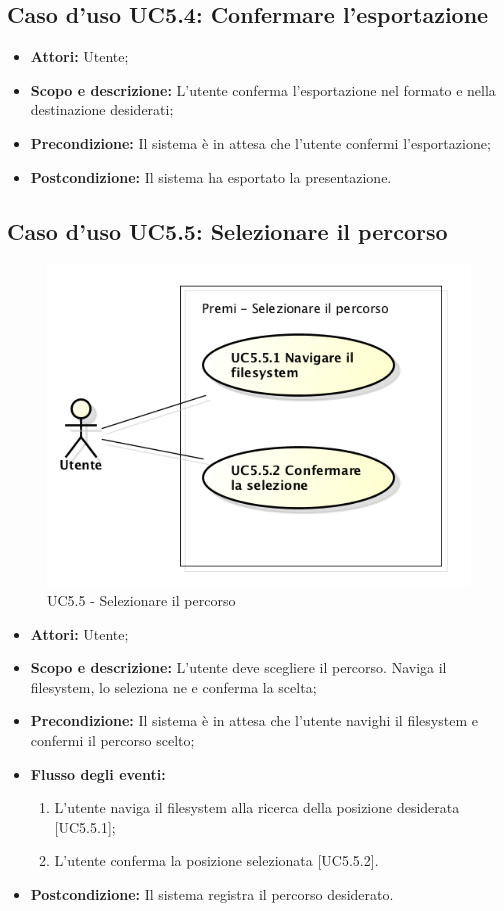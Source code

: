 \subsection{Caso d'uso UC5.4: Confermare l'esportazione}
	\begin{itemize}
		\item \textbf{Attori:} Utente;
		\item \textbf{Scopo e descrizione:} L'utente conferma l'esportazione nel formato e nella destinazione desiderati;
		\item \textbf{Precondizione:} Il sistema è in attesa che l'utente confermi l'esportazione;
		\item \textbf{Postcondizione:} Il sistema ha esportato la presentazione.
	\end{itemize}


\subsection{Caso d'uso UC5.5: Selezionare il percorso}
	\begin{figure}[h]
		\centering
		\includegraphics[scale=0.45] {img/UC5.5.png}
		\caption{UC5.5 - Selezionare il percorso}
	\end{figure}
	\begin{itemize}
		\item \textbf{Attori:} Utente;
		\item \textbf{Scopo e descrizione:} L'utente deve scegliere il percorso. Naviga il \gls{filesystem}, lo seleziona ne e conferma la scelta;
		\item \textbf{Precondizione:} Il sistema è in attesa che l'utente navighi il \gls{filesystem} e confermi il percorso scelto;
		\item \textbf{Flusso degli eventi:}
		\begin{enumerate}
			\item L'utente naviga il \gls{filesystem} alla ricerca della posizione desiderata [UC5.5.1];
			\item L'utente conferma la posizione selezionata [UC5.5.2].
		\end{enumerate}
		\item \textbf{Postcondizione:} Il sistema registra il percorso desiderato.
	\end{itemize}

